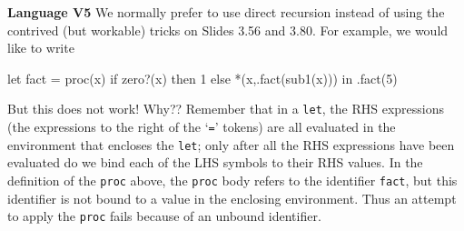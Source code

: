 \begin{minipage}[t]{\sw}
\slidenumber
\LARGE
{\bf Language V5}\exx
We normally prefer to use direct recursion instead
of using the contrived (but workable) tricks on Slides 3.56 and 3.80.
For example, we would like to write
\Large
\begin{qv}
let
  fact = proc(x) if zero?(x) then 1 else *(x,.fact(sub1(x)))
in
  .fact(5)
\end{qv}
\LARGE
But this does not work! Why??\exx
Remember that in a \verb'let',
the RHS expressions
(the expressions to the right of the `\verb'='' tokens)
are all evaluated
in the environment that encloses the \verb'let';
only after all the RHS expressions have been evaluated
do we bind each of the LHS symbols to their RHS values.\exx
In the definition of the \verb'proc' above,
the \verb'proc' body refers to the identifier \verb'fact',
but this identifier is not bound to a value
in the enclosing environment.
Thus an attempt to apply the \verb'proc'
fails because of an unbound identifier.
\end{minipage}
\clearpage
